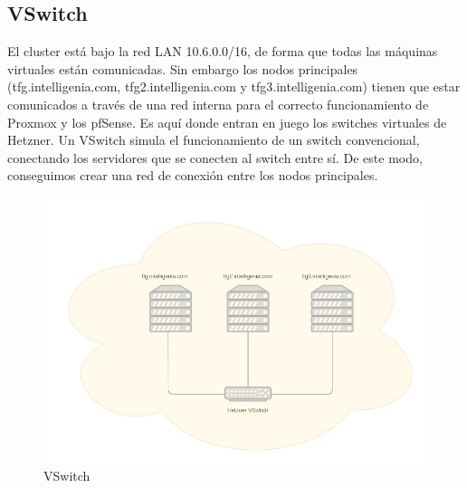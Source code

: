 	\subsection{VSwitch}
	\begin{text}
		El cluster está bajo la red LAN 10.6.0.0/16, de forma que todas las máquinas virtuales están comunicadas. Sin embargo los nodos principales (tfg.intelligenia.com, tfg2.intelligenia.com y tfg3.intelligenia.com) tienen que estar comunicados a través de una red interna para el correcto funcionamiento de Proxmox y los pfSense.
		Es aquí donde entran en juego los switches virtuales de Hetzner. Un VSwitch simula el funcionamiento de un switch convencional, conectando los servidores que se conecten al switch entre sí. De este modo, conseguimos crear una red de conexión entre los nodos principales.
		
		 \begin{figure}[!hbt]
		 	\centering
		 	\includegraphics[scale=0.4]{imagenes/Analisis/vswitch.jpg}
		 	\caption[VSwitch]{VSwitch}
		 	\label{VSwitch}
		 \end{figure}
	\end{text}

	
	
	